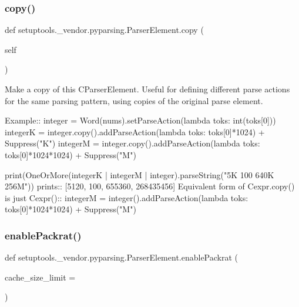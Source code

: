 \subsubsection{\texorpdfstring{copy()}{copy()}}
{\footnotesize\ttfamily def setuptools.\+\_\+vendor.\+pyparsing.\+Parser\+Element.\+copy (\begin{DoxyParamCaption}\item[{}]{self }\end{DoxyParamCaption})}

\begin{DoxyVerb}Make a copy of this C{ParserElement}.  Useful for defining different parse actions
for the same parsing pattern, using copies of the original parse element.

Example::
    integer = Word(nums).setParseAction(lambda toks: int(toks[0]))
    integerK = integer.copy().addParseAction(lambda toks: toks[0]*1024) + Suppress("K")
    integerM = integer.copy().addParseAction(lambda toks: toks[0]*1024*1024) + Suppress("M")
    
    print(OneOrMore(integerK | integerM | integer).parseString("5K 100 640K 256M"))
prints::
    [5120, 100, 655360, 268435456]
Equivalent form of C{expr.copy()} is just C{expr()}::
    integerM = integer().addParseAction(lambda toks: toks[0]*1024*1024) + Suppress("M")
\end{DoxyVerb}
 \mbox{\label{classsetuptools_1_1__vendor_1_1pyparsing_1_1_parser_element_a93ea62f4f71af75efc5d024e262485b6}} 
\subsubsection{\texorpdfstring{enable\+Packrat()}{enablePackrat()}}
{\footnotesize\ttfamily def setuptools.\+\_\+vendor.\+pyparsing.\+Parser\+Element.\+enable\+Packrat (\begin{DoxyParamCaption}\item[{}]{cache\+\_\+size\+\_\+limit = {} }\end{DoxyParamCaption})\hspace{0.3cm}{\ttfamily [static]}}


